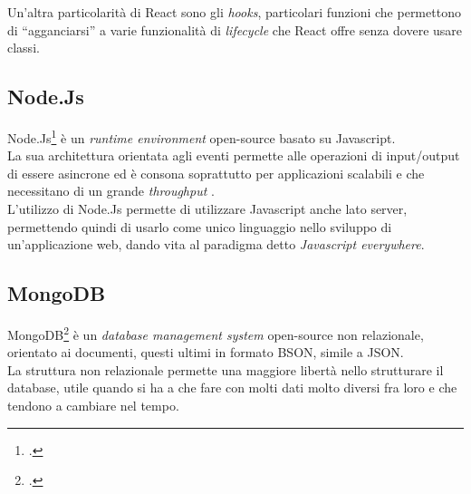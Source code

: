Un'altra particolarità di React sono gli \emph{hooks}, particolari funzioni che permettono di ``agganciarsi'' a varie funzionalità di \emph{lifecycle} che React offre senza dovere usare classi.

\subsection{Node.Js}

Node.Js\footcite{site:node.js} è un \emph{runtime environment} open-source basato su Javascript.\\
La sua architettura orientata agli eventi permette alle operazioni di input/output di essere asincrone ed è consona soprattutto per applicazioni scalabili e che necessitano di un grande \emph{throughput} .\\
L'utilizzo di Node.Js permette di utilizzare Javascript anche lato server, permettendo quindi di usarlo come unico linguaggio nello sviluppo di un'applicazione web, dando vita al paradigma detto \emph{Javascript everywhere}.\\

\subsection{MongoDB}

MongoDB\footcite{site:mongo} è un \emph{database management system} open-source non relazionale, orientato ai documenti, questi ultimi in formato BSON, simile a JSON.\\
La struttura non relazionale permette una maggiore libertà nello strutturare il database, utile quando si ha a che fare con molti dati molto diversi fra loro e che tendono a cambiare nel tempo.